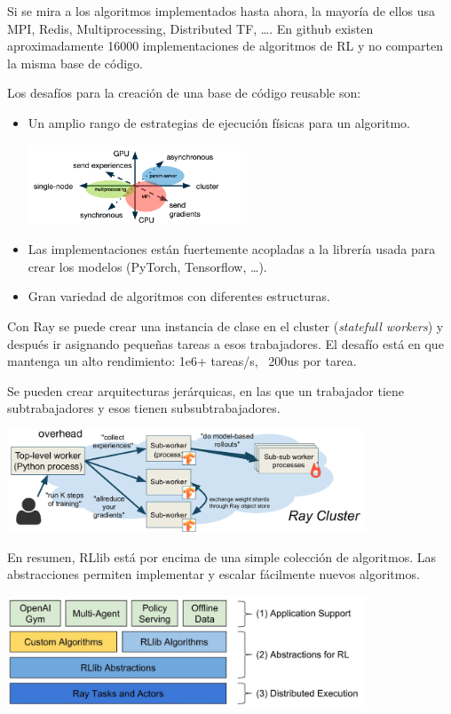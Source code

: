  Si se mira a los algoritmos implementados hasta ahora, la mayoría de ellos usa MPI, Redis,
 Multiprocessing, Distributed TF, \ldots. En github existen aproximadamente 16000
 implementaciones de algoritmos de RL y no comparten la misma base de código.

 Los desafíos para la creación de una base de código reusable son:
 \begin{itemize}
     \item Un amplio rango de estrategias de ejecución físicas para un algoritmo.
\begin{center}
\includegraphics[width=0.5\textwidth]{figures/2020-07-13-180710_787x295_scrot.png}
\end{center}
     \item Las implementaciones están fuertemente acopladas a la librería usada para crear los
         modelos (PyTorch, Tensorflow, \ldots).
    \item Gran variedad de algoritmos con diferentes estructuras.
\end{itemize}

Con Ray se puede crear una instancia de clase en el cluster (\textit{statefull workers})
y después ir asignando pequeñas tareas a esos trabajadores. El desafío está en que mantenga
un alto rendimiento: 1e6+ tareas/s, ~200us por tarea.

Se pueden crear arquitecturas jerárquicas, en las que un trabajador tiene subtrabajadores y esos
tienen subsubtrabajadores.

\begin{center}
\includegraphics[width=0.8\textwidth]{figures/2020-07-13-185611_1225x351_scrot.png}
\end{center}

En resumen, RLlib está por encima de una simple colección de algoritmos. Las abstracciones
permiten implementar y escalar fácilmente nuevos algoritmos.

\begin{center}
\includegraphics[width=0.8\textwidth]{figures/2020-07-13-185917_976x302_scrot.png}
\end{center}
   


